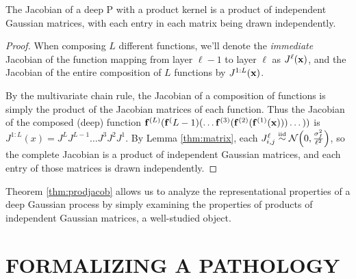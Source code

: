 \documentclass[twoside]{article}
\makeatletter
\newcommand{\fdeep}{\vf^{(1:L)}}
\newlength{\nonHumbleHeight}
\def\@humbleformat#1{{\settoheight{\nonHumbleHeight}{#1}\resizebox{!}{0.94\nonHumbleHeight}{#1}}}%
\def\humble#1{\@humbleformat{#1}}%
\newcommand{\gp}{{\humble GP}}
\newcommand{\sectiondist}{}
\makeatother
\begin{document}
\begin{theorem}
\label{thm:prodjacob}
The Jacobian of a deep \gp{} with a product kernel is a product of independent Gaussian matrices, with each entry in each matrix being drawn independently.
\end{theorem}
%
\begin{proof}
When composing $L$ different functions, we'll denote the \emph{immediate} Jacobian of the function mapping from layer $\ell -1$ to layer $\ell$ as $J^\ell({\bf{x}})$, and the Jacobian of the entire composition of $L$ functions by $J^{1:L}({\bf{x}})$.

By the multivariate chain rule, the Jacobian of a composition of functions is simply the product of the Jacobian matrices of each function.  
%
Thus the Jacobian of the composed (deep) function ${\bf{f}}^{(L)}({\bf{f}}^({L-1})(\dots {\bf{f}}^{(3)}( {\bf{f}}^{(2)}( {\bf{f}}^{(1)}({\bf{x}})))\dots))$ is
%
$ J^{1:L}(x) 
= J^L J^{L-1} \dots J^3 J^2 J^1$. 
By Lemma \ref{thm:matrix}, each ${J^\ell_{i,j} \simiid \Nt{0}{\frac{\sigma^2_f}{\ell^2}}}$, so the complete Jacobian is a product of independent Gaussian matrices, and each entry of those matrices is drawn independently.
\end{proof}

\vspace{-0.1in}
Theorem \ref{thm:prodjacob} allows us to analyze the representational properties of a deep Gaussian process by simply examining the properties of products of independent Gaussian matrices, a well-studied object.





\section{FORMALIZING A PATHOLOGY}
\sectiondist

\end{document}
